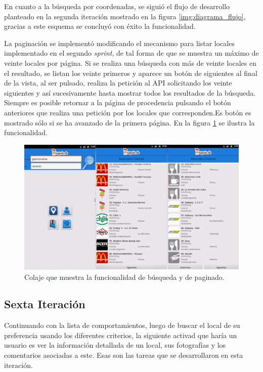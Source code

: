 En cuanto a la búsqueda por coordenadas, se siguió el flujo de desarrollo planteado en la segunda iteración mostrado en la figura \ref{img:diagrama_flujo}, gracias a este esquema se concluyó con éxito la funcionalidad.

La paginación se implementó modificando el mecanismo para listar locales implementado en el segundo \textit{sprint}, de tal forma de que se muestra un máximo de veinte locales por página. Si se realiza una búsqueda con más de veinte locales en el resultado, se listan los veinte primeros y aparece un botón de siguientes al final de la vista, al ser pulsado, realiza la petición al API solicitando los veinte siguientes y así sucesivamente hasta mostrar todos los resultados de la búsqueda. Siempre es posible retornar a la página de procedencia pulsando el botón anteriores que realiza una petición por los locales que corresponden.Es botón es mostrado sólo si se ha avanzado de la primera página. En la figura 
 \ref{img:doblesearch} se ilustra la funcionalidad.
 
\begin{figure}[h]
	\begin{center}
		\includegraphics[scale=0.3]{imagenes/search_doble.png}
	\end{center}
	\caption{
		\label{img:doblesearch}
		Colaje que muestra la funcionalidad de búsqueda y de paginado. 
	}
\end{figure}

\subsection{Sexta Iteración}
Continuando con la lista de comportamientos, luego de buscar el local de su preferencia usando los diferentes criterios, la siguiente activad que haría un usuario es ver la información detallada de un local, sus fotografías y los comentarios asociadas a este. Esas son las tareas que se desarrollaron en esta iteración. 
